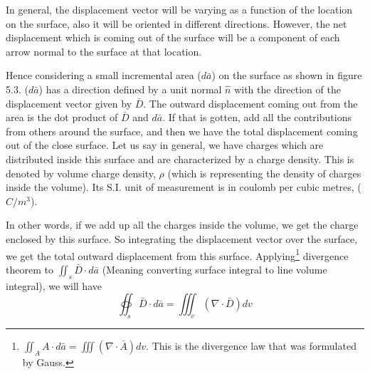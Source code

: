 In general, the displacement vector will be varying as a function of the location on the surface, also it will be oriented in different directions. However, the net displacement which is coming out of the surface will be a component of each arrow normal to the surface at that location.

Hence considering a small incremental area ($ d\bar{a} $) on the surface as shown in figure 5.3. ($ d\bar{a} $) has a direction defined by a unit normal $ \hat{n} $ with the direction of the displacement vector given by $ \bar{D} $. The outward displacement coming out from the area is the dot product of $ \bar{D} $ and $ d\bar{a} $. If that is gotten, add all the contributions from others around the surface, and then we have the total displacement coming out of the close surface. Let us say in general, we have charges which are distributed inside this surface and are characterized by a charge density. This is denoted by volume charge density, $ \rho $ (which is representing the density of charges inside the volume). Its S.I. unit of measurement is in coulomb per cubic metres, ($ C/m^{3} $).

In other words, if we add up all the charges inside the volume, we get the charge enclosed by this surface. So integrating the displacement vector over the surface, we get the total outward displacement from this surface. 
Applying\footnote[6]{
	$	\iint_A A\cdot d\bar{a} = \iiint (\nabla\cdot \bar{A})dv $. This is the divergence law that was formulated by Gauss.
} divergence theorem to $\iint_s\bar{D}\cdot d\bar{a}$ (Meaning converting surface integral to line volume integral), we will have 
\begin{equation*}
	\oiint_s\bar{D} \cdot d\bar{a} = \iiint_v(\nabla\cdot \bar{D})dv
\end{equation*}


